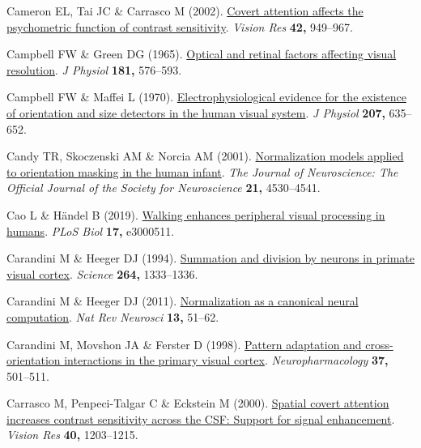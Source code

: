 \documentclass[
  letterpaper,
  DIV=11,
  numbers=noendperiod]{scrartcl}
\newlength{\cslhangindent}
\newenvironment{CSLReferences}[2] %
 {\begin{list}{}{%
  \setlength{\itemindent}{0pt}
  \setlength{\leftmargin}{0pt}
  \setlength{\parsep}{0pt}
  \ifodd #1
   \setlength{\leftmargin}{\cslhangindent}
   \setlength{\itemindent}{-1\cslhangindent}
  \fi
  \setlength{\itemsep}{#2\baselineskip}}}
 {\end{list}}
\begin{document}
\begin{CSLReferences}{1}{1}
Cameron EL, Tai JC \& Carrasco M (2002).
\href{https://doi.org/10.1016/s0042-6989(02)00039-1}{Covert attention
affects the psychometric function of contrast sensitivity}. \emph{Vision
Res} \textbf{42,} 949--967.

Campbell FW \& Green DG (1965).
\href{https://doi.org/10.1113/jphysiol.1965.sp007784}{Optical and
retinal factors affecting visual resolution}. \emph{J Physiol}
\textbf{181,} 576--593.

Campbell FW \& Maffei L (1970).
\href{https://doi.org/10.1113/jphysiol.1970.sp009085}{Electrophysiological
evidence for the existence of orientation and size detectors in the
human visual system}. \emph{J Physiol} \textbf{207,} 635--652.

Candy TR, Skoczenski AM \& Norcia AM (2001).
\href{https://doi.org/10.1523/JNEUROSCI.21-12-04530.2001}{Normalization
models applied to orientation masking in the human infant}. \emph{The
Journal of Neuroscience: The Official Journal of the Society for
Neuroscience} \textbf{21,} 4530--4541.

Cao L \& Händel B (2019).
\href{https://doi.org/10.1371/journal.pbio.3000511}{Walking enhances
peripheral visual processing in humans}. \emph{PLoS Biol} \textbf{17,}
e3000511.

Carandini M \& Heeger DJ (1994).
\href{https://doi.org/10.1126/science.8191289}{Summation and division by
neurons in primate visual cortex}. \emph{Science} \textbf{264,}
1333--1336.

Carandini M \& Heeger DJ (2011).
\href{https://doi.org/10.1038/nrn3136}{Normalization as a canonical
neural computation}. \emph{Nat Rev Neurosci} \textbf{13,} 51--62.

Carandini M, Movshon JA \& Ferster D (1998).
\href{https://doi.org/10.1016/s0028-3908(98)00069-0}{Pattern adaptation
and cross-orientation interactions in the primary visual cortex}.
\emph{Neuropharmacology} \textbf{37,} 501--511.

Carrasco M, Penpeci-Talgar C \& Eckstein M (2000).
\href{https://doi.org/10.1016/s0042-6989(00)00024-9}{Spatial covert
attention increases contrast sensitivity across the CSF: Support for
signal enhancement}. \emph{Vision Res} \textbf{40,} 1203--1215.


\end{CSLReferences}
\end{document}
